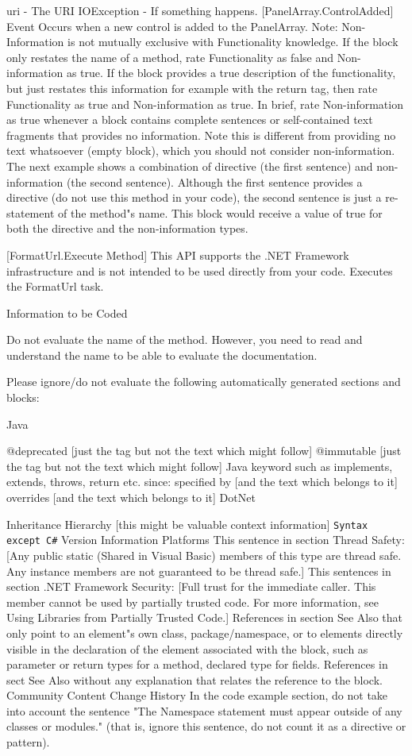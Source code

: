 uri - The URI
IOException - If something happens.
[PanelArray.ControlAdded] Event Occurs when a new control is added to the PanelArray.
Note: Non-Information is not mutually exclusive with Functionality knowledge. If the block only restates the name of a method, rate Functionality as false and Non-information as true. If the block provides a true description of the functionality, but just restates this information for example with the return tag, then rate Functionality as true and Non-information as true. In brief, rate Non-information as true whenever a block contains complete sentences or self-contained text fragments that provides no information.
Note
this is different from providing no text whatsoever (empty block), which you should not consider non-information.
The next example shows a combination of directive (the first sentence) and non-information (the second sentence). Although the first sentence provides a directive (do not use this method in your code), the second sentence is just a re-statement of the method"s name. This block would receive a value of true for both the directive and the non-information types.

[FormatUrl.Execute Method] This API supports the .NET Framework infrastructure and is not intended to be used directly from your code. Executes the FormatUrl task.
 

Information to be Coded

Do not evaluate the name of the method. However, you need to read and understand the name to be able to evaluate the documentation.

Please ignore/do not evaluate the following automatically generated sections and blocks:

Java

@deprecated [just the tag but not the text which might follow]
@immutable [just the tag but not the text which might follow]
Java keyword such as implements, extends, throws, return etc.
since:
specified by [and the text which belongs to it]
overrides [and the text which belongs to it]
DotNet

Inheritance Hierarchy [this might be valuable context information]
\verb|Syntax except C#|
Version Information
Platforms
This sentence in section Thread Safety: [Any public static (Shared in Visual Basic) members of this type are thread safe. Any instance members are not guaranteed to be thread safe.]
This sentences in section .NET Framework Security: [Full trust for the immediate caller. This member cannot be used by partially trusted code. For more information, see Using Libraries from Partially Trusted Code.]
References in section See Also that only point to an element"s own class, package/namespace, or to elements directly visible in the declaration of the element associated with the block, such as parameter or return types for a method, declared type for fields.
References in sect See Also without any explanation that relates the reference to the block.
Community Content
Change History
In the code example section, do not take into account the sentence "The Namespace statement must appear outside of any classes or modules." (that is, ignore this sentence, do not count it as a directive or pattern).
 

